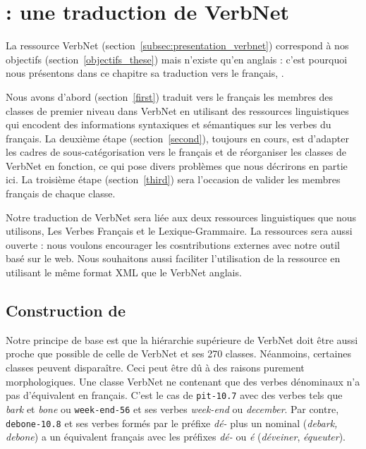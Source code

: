 \chapter{\verbenet{} : une traduction de VerbNet}
\label{ch:verbnet}

La ressource VerbNet (section~\ref{subsec:presentation_verbnet}) correspond à
nos objectifs (section~\ref{objectifs_these}) mais n'existe qu'en anglais :
c'est pourquoi nous présentons dans ce chapitre sa traduction vers le français,
\verbenet{}.

Nous avons d'abord (section~\ref{first}) traduit vers le français les membres
des classes de premier niveau dans VerbNet en utilisant des ressources
linguistiques qui encodent des informations syntaxiques et sémantiques sur les
verbes du français. La deuxième étape (section~\ref{second}), toujours en
cours, est d'adapter les cadres de sous-catégorisation vers le français et de
réorganiser les classes de VerbNet en fonction, ce qui pose divers problèmes
que nous décrirons en partie ici. La troisième étape (section~\ref{third}) sera
l'occasion de valider les membres français de chaque classe.

Notre traduction de VerbNet sera liée aux deux ressources linguistiques que
nous utilisons, Les Verbes Français et le Lexique-Grammaire. La ressources sera
aussi ouverte : nous voulons encourager les cosntributions externes avec notre
outil basé sur le web. Nous souhaitons aussi faciliter l'utilisation de la
ressource en utilisant le même format XML que le VerbNet anglais.

\section{Construction de \verbenet{}}

Notre principe de base est que la hiérarchie supérieure de VerbNet doit être
aussi proche que possible de celle de VerbNet et ses 270 classes. Néanmoins,
certaines classes peuvent disparaître. Ceci peut être dû à des raisons purement
morphologiques. Une classe VerbNet ne contenant que des verbes dénominaux n'a
pas d'équivalent en français. C'est le cas de \texttt{pit-10.7} avec des verbes
tels que \emph{bark} et \emph{bone} ou \texttt{week-end-56} et ses verbes
\emph{week-end} ou \emph{december}. Par contre, \texttt{debone-10.8} et ses
verbes formés par le préfixe \emph{dé-} plus un nominal (\emph{debark, debone})
a un équivalent français avec les préfixes \emph{dé-} ou \emph{é}
(\emph{déveiner}, \emph{équeuter}).

